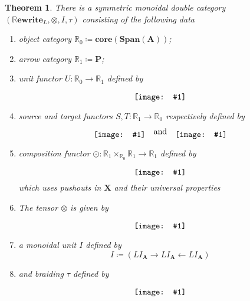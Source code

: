 \documentclass{amsart}
\newcommand{\RR}{\mathbb{R}}
\newcommand{\A}{\cat{A}}
\newcommand{\NonLinArrCat}{\cat{P}}
\newcommand{\X}{\cat{X}}
\newcommand{\core}{\mathbf{core}}
\newcommand{\cat}[1]{\mathbf{#1}}
\newcommand{\from}{\colon}
\newcommand{\diagram}[1]{\raisebox{-0.5\height}{\texttt{[image: \#1]}}}
\newcommand{\Span}{\mathbf{Span}}
\newcommand{\RRewrite}{ \mathbb{R}\mathbf{ewrite} }
\newtheorem{theorem}{Theorem}[section]
\theoremstyle{remark}
\theoremstyle{definition}
\begin{document}
\begin{theorem} \label{thm:dbl-rewr-smc}
  There is a symmetric monoidal double category
  $ ( \RRewrite_{L} , \otimes , I, \tau ) $ consisting of the
  following data
  
  \begin{enumerate}
    \item object category $ \RR_0 \coloneqq \core ( \Span (\A) ) $;
    \item arrow category $ \RR_1 \coloneqq \NonLinArrCat $;
    \item unit functor $ U \from \RR_0 \to \RR_1 $ defined by
      \[
        \diagram{diag_nlr_dbl-rewrite-unit-functor}
      \]
    \item source and target functors $ S , T \from \RR_1 \to \RR_0 $
      respectively defined by
      \[
        \diagram{diag_nlr_dbl-rewrite-source-functor}
        \quad \text{and} \quad
        \diagram{diag_nlr_dbl-rewrite-target-functor}
      \]
    \item composition functor
      $ \odot \from \RR_1 \times_{\RR_0} \RR_1 \to \RR_1 $ defined by
      \[
        \diagram{diag_nlr_dbl-rewrite-composition-functor}
      \]
      which uses pushouts in $ \X $ and their universal properties
    \item The tensor $ \otimes $ is given by
      \[
        \diagram{diag_nlr_dbl-rewrite-tensor}
      \]
    \item a monoidal unit $ I $ defined by
      \[
        I \coloneqq ( L I_{\A} \to L I_{\A} \gets L I_{\A} )
      \]
   \item and braiding $ \tau $ defined by
     \[
       \diagram{diag_nlr_dbl-rewrite-braiding}
     \]
   \end{enumerate}
\end{theorem}
\end{document}
